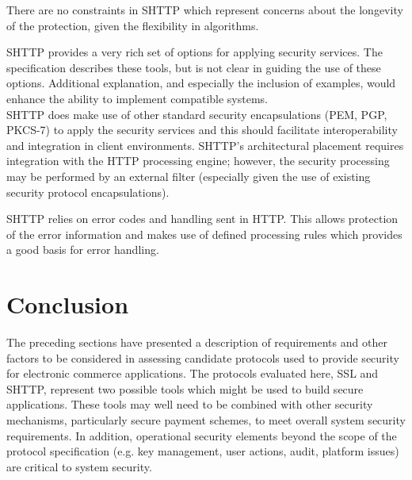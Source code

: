   There are no constraints in SHTTP which represent concerns about the
  longevity of the protection, given the flexibility in algorithms.

  
  SHTTP provides a very rich set of options for applying security services.
  The specification describes these tools, but is not clear in guiding the
  use of these options. Additional explanation, and especially the
  inclusion of examples, would enhance the ability to implement compatible
  systems.\\
  
  SHTTP does make use of other standard security encapsulations (PEM, PGP,
  PKCS-7) to apply the security services and this should facilitate
  interoperability and integration in client environments. SHTTP's
  architectural placement requires integration with the HTTP processing
  engine; however, the security processing may be performed by an external
  filter (especially given the use of existing security protocol
  encapsulations).

  
  SHTTP relies on error codes and handling sent in HTTP. This allows
  protection of the error information and makes use of defined processing
  rules which provides a good basis for error handling.
\latexhtml{\end{itemize}}{\end{htmllist}}


\section{Conclusion}

The preceding sections have presented a description of requirements and
other factors to be considered in assessing candidate protocols used to
provide security for electronic commerce applications. The protocols
evaluated here, SSL and SHTTP, represent two possible tools which might
be used to build secure applications. These tools may well need to be
combined with other security mechanisms, particularly secure payment
schemes, to meet overall system security requirements. In addition,
operational security elements beyond the scope of the protocol
specification (e.g. key management, user actions, audit, platform
issues) are critical to system security.\\

